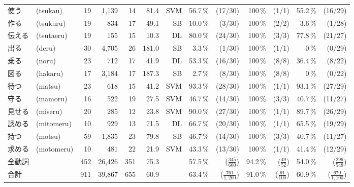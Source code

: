 \begin{table*}[htbp]
\begin{center}
\begin{tabular}[c]{|l@{}l@{ }|@{ }r@{ }|@{ }r@{ }|@{ }r@{ }|@{ }r@{ }|@{ }r@{ }|r@{ }r@{ }|r@{}r@{ }|r@{ }r@{ }|}
      使う & (tsukau) & 19 & 1,139 & 14 & 81.4 & SVM 
      & 56.7\,\% & (17/30) & 100\,\% & (1/1) & 55.2\,\% & (16/29) \\
      作る & (tsukuru) & 19 & 834 & 17 & 49.1 & SB 
      & 10.0\,\% & (3/30) & 100\,\% & (2/2) & 3.6\,\% & (1/28) \\
      伝える & (tsutaeru) & 19 & 155 & 15 & 10.3 & DL 
      & 80.0\,\% & (24/30) & 100\,\% & (3/3) & 77.8\,\% & (21/27) \\
      出る & (deru) & 30 & 4,705 & 26 & 181.0 & SB 
      & 3.3\,\% & (1/30) & 100\,\% & (1/1) & 0\,\% & (0/29) \\
      乗る & (noru) & 23 & 712 & 17 & 41.9 & DL 
      & 53.3\,\% & (16/30) & 100\,\% & (8/8) & 36.4\,\% & (8/22) \\
      図る & (hakaru) & 17 & 3,184 & 17 & 187.3 & SB 
      & 2.7\,\% & (8/30) & 100\,\% & (8/8) & 0\,\% & (0/22) \\
      待つ & (matsu) & 23 & 618 & 15 & 41.2 & SVM 
      & 93.3\,\% & (28/30) & 100\,\% & (1/1) & 93.1\,\% & (27/29) \\
      守る & (mamoru) & 16 & 522 & 19 & 27.5 & SVM 
      & 46.7\,\% & (14/30) & 100\,\% & (3/3) & 40.7\,\% & (11/27) \\
      見せる & (miseru) & 20 & 285 & 12 & 23.8 & SVM 
      & 90.0\,\% & (27/30) & 100\,\% & (1/1) & 89.7\,\% & (26/29) \\
      認める & (mitomeru) & 10 & 929 & 13 & 71.5 & DL 
      & 66.7\,\% & (20/30) & 100\,\% & (1/1) & 65.5\,\% & (19/29) \\
      持つ & (motsu) & 59 & 1,835 & 23 & 79.8 & SB 
      & 46.7\,\% & (14/30) & 100\,\% & (3/3) & 40.7\,\% & (11/27) \\
      求める & (motomeru) & 10 & 481 & 22 & 21.9 & SVM 
      & 43.3\,\% & (13/30) & 100\,\% & (1/1) & 41.4\,\% & (12/29) \\
      \hline
      全動詞 & & 452 & 26,426 & 351 & 75.3 & 
      & 57.5\,\% & ($\frac{345}{600}$) & 94.2\,\% & ($\frac{49}{52}$) 
      & 54.0\,\% & ($\frac{296}{548}$) \\
      \hline
      合計 & & 911 & 39,867 & 655 & 60.9 & 
      & 63.4\,\% & ($\frac{761}{1,200}$) & 91.0\,\% & ($\frac{91}{100}$) 
      & 60.9\,\% & ($\frac{670}{1,100}$) \\
      \hline
    \end{tabular}
  \end{center}
\end{table*}


